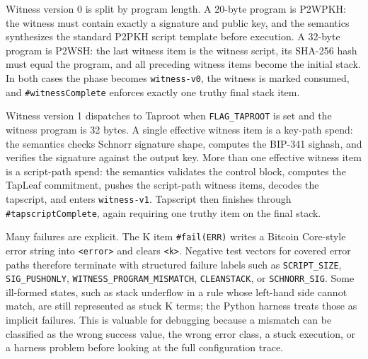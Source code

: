 \documentclass[conference]{IEEEtran}
\newcommand{\kcell}[1]{\texttt{<#1>}\xspace}
\begin{document}
Witness version 0 is split by program length.  A 20-byte program is P2WPKH:
the witness must contain exactly a signature and public key, and the semantics
synthesizes the standard P2PKH script template before execution.  A 32-byte
program is P2WSH: the last witness item is the witness script, its SHA-256 hash
must equal the program, and all preceding witness items become the initial
stack.  In both cases the phase becomes \texttt{witness-v0}, the witness is
marked consumed, and \texttt{\#witnessComplete} enforces exactly one truthy
final stack item.

Witness version 1 dispatches to Taproot when \texttt{FLAG\_TAPROOT} is set and
the witness program is 32 bytes.  A single effective witness item is a key-path
spend: the semantics checks Schnorr signature shape, computes the BIP-341
sighash, and verifies the signature against the output key.  More than one
effective witness item is a script-path spend: the semantics validates the
control block, computes the TapLeaf commitment, pushes the script-path witness
items, decodes the tapscript, and enters \texttt{witness-v1}.  Tapscript then
finishes through \texttt{\#tapscriptComplete}, again requiring one truthy item
on the final stack.

\begin{table}[t]
  \caption{Validation phases}
  \label{tab:phases}
  \centering
  \footnotesize
\end{table}

Many failures are explicit.  The K item \texttt{\#fail(ERR)} writes a Bitcoin
Core-style error string into \kcell{error} and clears \kcell{k}.  Negative test
vectors for covered error paths therefore terminate with structured failure
labels such as \texttt{SCRIPT\_SIZE}, \texttt{SIG\_PUSHONLY},
\texttt{WITNESS\_PROGRAM\_MISMATCH}, \texttt{CLEANSTACK}, or
\texttt{SCHNORR\_SIG}.  Some ill-formed states, such as stack underflow in a
rule whose left-hand side cannot match, are still represented as stuck K terms;
the Python harness treats those as implicit failures.  This is valuable for
debugging because a mismatch can be classified as the wrong success value, the
wrong error class, a stuck execution, or a harness problem before looking at the
full configuration trace.
\end{document}
